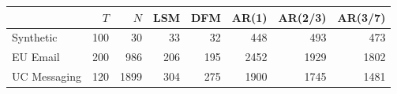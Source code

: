\begin{tabular}{|l|rr|*{5}{r}|} \hline
                     &   $T$ &  $N$ &  LSM & DFM & AR(1) & AR(2/3) & AR(3/7) \\ \hline
    Synthetic   &   100 &   30 &   33 &  32 &   448 &     493 &     473 \\
    EU Email     &   200 &  986 &  206 & 195 &  2452 &    1929 &    1802 \\
    UC Messaging &   120 & 1899 &  304 & 275 &  1900 &    1745 &    1481 \\ \hline
\end{tabular}